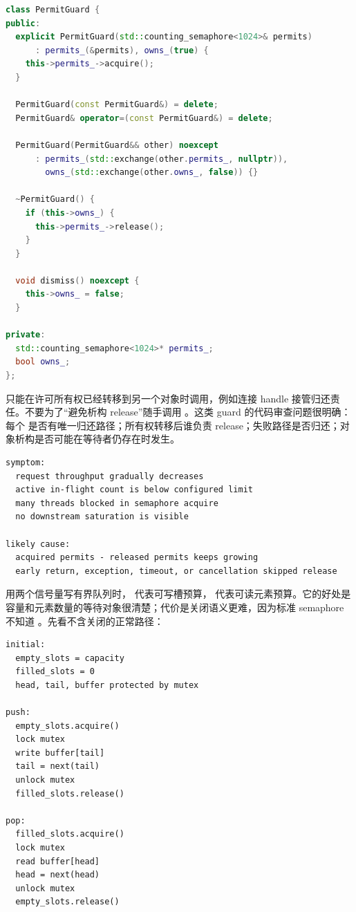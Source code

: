 \begin{lstlisting}[language=C++,caption={许可守卫把 release 绑定到作用域}]
class PermitGuard {
public:
  explicit PermitGuard(std::counting_semaphore<1024>& permits)
      : permits_(&permits), owns_(true) {
    this->permits_->acquire();
  }

  PermitGuard(const PermitGuard&) = delete;
  PermitGuard& operator=(const PermitGuard&) = delete;

  PermitGuard(PermitGuard&& other) noexcept
      : permits_(std::exchange(other.permits_, nullptr)),
        owns_(std::exchange(other.owns_, false)) {}

  ~PermitGuard() {
    if (this->owns_) {
      this->permits_->release();
    }
  }

  void dismiss() noexcept {
    this->owns_ = false;
  }

private:
  std::counting_semaphore<1024>* permits_;
  bool owns_;
};
\end{lstlisting}

 只能在许可所有权已经转移到另一个对象时调用，例如连接 handle 接管归还责任。不要为了“避免析构 release”随手调用 。这类 guard 的代码审查问题很明确：每个  是否有唯一归还路径；所有权转移后谁负责 release；失败路径是否归还；对象析构是否可能在等待者仍存在时发生。

\begin{lstlisting}[numbers=none,caption={许可泄漏的证据形状}]
symptom:
  request throughput gradually decreases
  active in-flight count is below configured limit
  many threads blocked in semaphore acquire
  no downstream saturation is visible

likely cause:
  acquired permits - released permits keeps growing
  early return, exception, timeout, or cancellation skipped release
\end{lstlisting}

用两个信号量写有界队列时， 代表可写槽预算， 代表可读元素预算。它的好处是容量和元素数量的等待对象很清楚；代价是关闭语义更难，因为标准 semaphore 不知道 。先看不含关闭的正常路径：

\begin{lstlisting}[numbers=none,caption={双信号量 bounded buffer 的正常路径}]
initial:
  empty_slots = capacity
  filled_slots = 0
  head, tail, buffer protected by mutex

push:
  empty_slots.acquire()
  lock mutex
  write buffer[tail]
  tail = next(tail)
  unlock mutex
  filled_slots.release()

pop:
  filled_slots.acquire()
  lock mutex
  read buffer[head]
  head = next(head)
  unlock mutex
  empty_slots.release()
\end{lstlisting}

